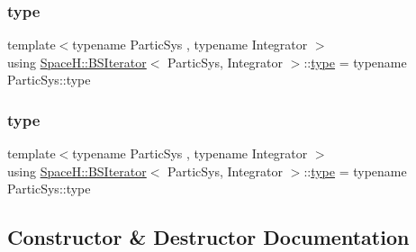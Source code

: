\mbox{\label{class_space_h_1_1_b_s_iterator_a659e97efd0fe41f3993663d0ec9b75e7}} 
\subsubsection{\texorpdfstring{type}{type}\hspace{0.1cm}{\footnotesize\ttfamily [1/2]}}
{\footnotesize\ttfamily template$<$typename Partic\+Sys , typename Integrator $>$ \\
using \mbox{\hyperlink{class_space_h_1_1_b_s_iterator}{Space\+H\+::\+B\+S\+Iterator}}$<$ Partic\+Sys, Integrator $>$\+::\mbox{\hyperlink{class_space_h_1_1_b_s_iterator_a659e97efd0fe41f3993663d0ec9b75e7}{type}} =  typename Partic\+Sys\+::type}

\mbox{\label{class_space_h_1_1_b_s_iterator_a659e97efd0fe41f3993663d0ec9b75e7}} 
\subsubsection{\texorpdfstring{type}{type}\hspace{0.1cm}{\footnotesize\ttfamily [2/2]}}
{\footnotesize\ttfamily template$<$typename Partic\+Sys , typename Integrator $>$ \\
using \mbox{\hyperlink{class_space_h_1_1_b_s_iterator}{Space\+H\+::\+B\+S\+Iterator}}$<$ Partic\+Sys, Integrator $>$\+::\mbox{\hyperlink{class_space_h_1_1_b_s_iterator_a659e97efd0fe41f3993663d0ec9b75e7}{type}} =  typename Partic\+Sys\+::type}



\subsection{Constructor \& Destructor Documentation}
\mbox{\label{class_space_h_1_1_b_s_iterator_aef64ddf4540fa44e7c408e0ed7caabb2}} 
